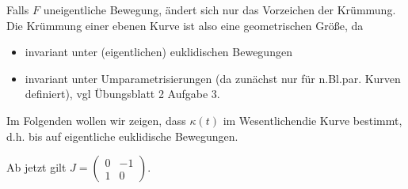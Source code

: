 \documentclass{mycourse}
\begin{document}
\begin{note}
Falls $F$ uneigentliche Bewegung, ändert sich nur das Vorzeichen der Krümmung. Die Krümmung einer ebenen Kurve ist also eine geometrischen Größe, da
\begin{itemize}
	\item invariant unter (eigentlichen) euklidischen Bewegungen
	\item invariant unter Umparametrisierungen (da zunächst nur für n.Bl.par. Kurven definiert), vgl Übungsblatt 2 Aufgabe 3.
\end{itemize}
Im Folgenden wollen wir zeigen, dass $\kappa(t)$ \glqq im Wesentlichen\grqq die Kurve bestimmt, d.h. bis auf eigentliche euklidische Bewegungen.
\end{note}

Ab jetzt gilt $J = \begin{pmatrix} 0 & -1 \\ 1 & 0 \end{pmatrix}$.
\end{document}
